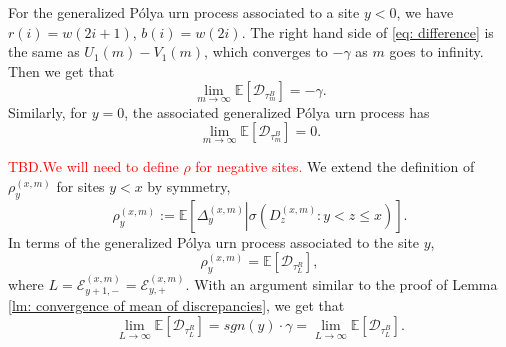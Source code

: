 \documentclass[twoside,12pt,a4paper]{article}
\numberwithin{equation}{section}
\newcommand\TBD{\textcolor{red}{TBD.}}
\begin{document}
		For the generalized P\'{o}lya urn process associated to a site $y<0$, we have $r(i) = w(2i+1)$, $b(i) =w(2i)$. The right hand side of \eqref{eq: difference} is the same as $U_1(m)-V_1(m)$, which converges to $-\gamma$ as $m$ goes to infinity. Then we get that  $$\lim_{m\to\infty}\mathbb{E}\left[ \mathcal{D}_{\tau^B_m} \right] = -\gamma.$$
		Similarly, for $y=0$, the associated generalized P\'{o}lya urn process has 
		$$\lim_{m\to\infty}\mathbb{E}\left[ \mathcal{D}_{\tau^B_m} \right] = 0.$$
		
		\TBD \textcolor{red}{We will need to define $\rho$ for negative sites.} We extend the definition of $\rho^{(x,m)}_y$ for sites $y< x$ by symmetry, 
		$$\rho^{(x,m)}_y := \mathbb{E}\left[  \Delta^{(x,m)}_y   \left\vert  \sigma\left( D^{(x,m)}_z:  y<z\leq  x  \right. \right) \right].   $$ In terms of the generalized P\'{o}lya urn process associated to the site $y$,
		\begin{equation} \label{eq: extended definition}
			\rho^{(x,m)}_y = \mathbb{E}\left[\mathcal{D}_{\tau_L^R}\right], 
		\end{equation} where $L = \mathcal{E}^{(x,m)}_{y+1,-} = \mathcal{E}^{(x,m)}_{y,+}.$ With an argument similar to the proof of Lemma \ref{lm: convergence of mean of discrepancies}, we get that 
		\begin{equation}\label{eq: mean of discrepancies for left sites}
			\lim_{L\to \infty} \mathbb{E}\left[\mathcal{D}_{\tau_L^R}\right] =  sgn(y) \cdot \gamma = \lim_{L\to \infty} \mathbb{E}\left[\mathcal{D}_{\tau_L^B}\right].
		\end{equation}
		
\end{document}
